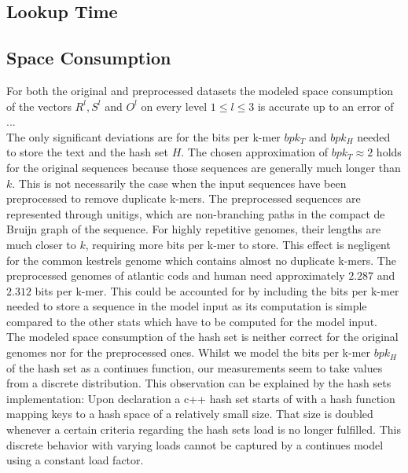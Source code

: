 \documentclass[a4paper,titlepage,onecolumn,oneside,12pt,nenglish,titlepage=firstiscover]{scrbook}
\theoremstyle{plain} %
\theoremstyle{definition} %
\theoremstyle{remark} %
\theoremstyle{plain}
\newcommand{\level}{l}
\begin{document}
\subsection{Lookup Time}


\subsection{Space Consumption}
For both the original and preprocessed datasets the modeled space consumption of the vectors $R^\level, S^\level$ and $O^\level$ on every level $1 \leq \level \leq 3$ is accurate up to an error of $..$.\\
The only significant deviations are for the bits per k-mer $bpk_T$ and $bpk_H$ needed to store the text and the hash set $H$. The chosen approximation of $bpk_T \approx 2$ holds for the original sequences because those sequences are generally much longer than $k$. This is not necessarily the case when the input sequences have been preprocessed to remove duplicate k-mers. The preprocessed sequences are represented through unitigs, which are non-branching paths in the compact de Bruijn graph of the sequence. For highly repetitive genomes, their lengths are much closer to $k$, requiring more bits per k-mer to store. This effect is negligent for the common kestrels genome which contains almost no duplicate k-mers. The preprocessed genomes of atlantic cods and human need approximately $2.287$ and $2.312$ bits per k-mer. This could be accounted for by including the bits per k-mer needed to store a sequence in the model input as its computation is simple compared to the other stats which have to be computed for the model input.\\
The modeled space consumption of the hash set is neither correct for the original genomes nor for the preprocessed ones. Whilst we model the bits per k-mer $bpk_H$ of the hash set as a continues function, our measurements seem to take values from a discrete distribution. This observation can be explained by the hash sets implementation: Upon declaration a c++ hash set starts of with a hash function mapping keys to a hash space of a relatively small size. That size is doubled whenever a certain criteria regarding the hash sets load is no longer fulfilled. This discrete behavior with varying loads cannot be captured by a continues model using a constant load factor.\\
\end{document}
